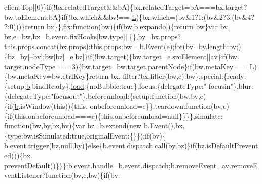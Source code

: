 \begin{DoxyCode}
      clientTop||0)\}\textcolor{keywordflow}{if}(!bx.relatedTarget&&bA)\{bx.relatedTarget=bA===bx.target?bw.toElement:bA\}\textcolor{keywordflow}{if}(!bx.which&&bv!==
      \hyperlink{jquery_8js_a38ee4c0b5f4fe2a18d0c783af540d253}{L})\{bx.which=(bv&1?1:(bv&2?3:(bv&4?2:0)))\}\textcolor{keywordflow}{return} bx\}\},fix:\textcolor{keyword}{function}(bw)\{\textcolor{keywordflow}{if}(bw[\hyperlink{jquery_8js_aa4026ad5544b958e54ce5e106fa1c805}{b}.expando])\{\textcolor{keywordflow}{return} bw\}var bv,
      bz,e=bw,bx=\hyperlink{jquery_8js_aa4026ad5544b958e54ce5e106fa1c805}{b}.event.fixHooks[bw.type]||\{\},by=bx.props?this.props.concat(bx.props):this.props;bw=
      \hyperlink{jquery_8js_aa4026ad5544b958e54ce5e106fa1c805}{b}.Event(e);\textcolor{keywordflow}{for}(bv=by.length;bv;)\{bz=by[--bv];bw[bz]=e[bz]\}\textcolor{keywordflow}{if}(!bw.target)\{bw.target=e.srcElement||av\}\textcolor{keywordflow}{if}(bw.
      target.nodeType===3)\{bw.target=bw.target.parentNode\}\textcolor{keywordflow}{if}(bw.metaKey===\hyperlink{jquery_8js_a38ee4c0b5f4fe2a18d0c783af540d253}{L})\{bw.metaKey=bw.ctrlKey\}\textcolor{keywordflow}{return} bx.
      filter?bx.filter(bw,e):bw\},special:\{ready:\{setup:\hyperlink{jquery_8js_aa4026ad5544b958e54ce5e106fa1c805}{b}.bindReady\},\hyperlink{over__hinder_8c_a29122f6df4a054b8141015682f877c82}{load}:\{noBubble:\textcolor{keyword}{true}\},focus:\{delegateType:\textcolor{stringliteral}{"
      focusin"}\},blur:\{delegateType:\textcolor{stringliteral}{"focusout"}\},beforeunload:\{setup:\textcolor{keyword}{function}(bw,bv,e)\{\textcolor{keywordflow}{if}(\hyperlink{jquery_8js_aa4026ad5544b958e54ce5e106fa1c805}{b}.isWindow(\textcolor{keyword}{this}))\{this.
      onbeforeunload=e\}\},teardown:\textcolor{keyword}{function}(bv,e)\{\textcolor{keywordflow}{if}(this.onbeforeunload===e)\{this.onbeforeunload=null\}\}\}\},simulate:\textcolor{keyword}{
      function}(bw,by,bx,bv)\{var bz=\hyperlink{jquery_8js_aa4026ad5544b958e54ce5e106fa1c805}{b}.extend(\textcolor{keyword}{new} \hyperlink{jquery_8js_aa4026ad5544b958e54ce5e106fa1c805}{b}.Event(),bx,\{type:bw,isSimulated:\textcolor{keyword}{true},originalEvent:\{\}\});\textcolor{keywordflow}{if}(bv)\{
      \hyperlink{jquery_8js_aa4026ad5544b958e54ce5e106fa1c805}{b}.event.trigger(bz,null,by)\}\textcolor{keywordflow}{else}\{\hyperlink{jquery_8js_aa4026ad5544b958e54ce5e106fa1c805}{b}.event.dispatch.call(by,bz)\}\textcolor{keywordflow}{if}(bz.isDefaultPrevented())\{bx.
      preventDefault()\}\}\};\hyperlink{jquery_8js_aa4026ad5544b958e54ce5e106fa1c805}{b}.event.handle=\hyperlink{jquery_8js_aa4026ad5544b958e54ce5e106fa1c805}{b}.event.dispatch;\hyperlink{jquery_8js_aa4026ad5544b958e54ce5e106fa1c805}{b}.removeEvent=av.removeEventListener?\textcolor{keyword}{function}(bv,e,bw)\{\textcolor{keywordflow}{if}(bv.

\end{DoxyCode}
